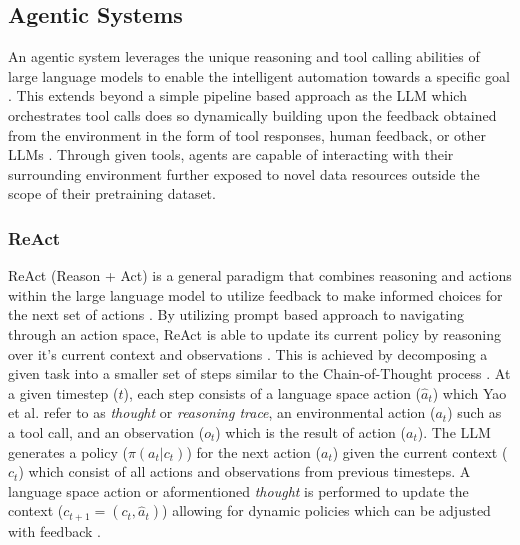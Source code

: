 \subsection{Agentic Systems}

An agentic system leverages the unique reasoning and tool calling abilities of
large language models to enable the intelligent automation towards a specific
goal \cite{pak_agentic_2026, jadhav_large_2026, chandrasekhar_automating_2025,
pak_rocketsmith_2026}. This extends beyond a simple pipeline based approach as
the LLM which orchestrates tool calls does so dynamically building upon the
feedback obtained from the environment in the form of tool responses, human
feedback, or other LLMs \cite{yao_react_2022}. Through given tools, agents are
capable of interacting with their surrounding environment further exposed to
novel data resources outside the scope of their pretraining dataset.

\subsubsection{ReAct}
ReAct (Reason + Act) is a general paradigm that combines reasoning and actions
within the large language model to utilize feedback to make informed choices for
the next set of actions \cite{yao_react_2022}. By utilizing prompt based
approach to navigating through an action space, ReAct is able to update its
current policy by reasoning over it's current context and observations
\cite{yao_react_2022}. This is achieved by decomposing a given task into a
smaller set of steps similar to the Chain-of-Thought process
\cite{yao_react_2022, wei_chain--thought_2023}. At a given timestep ($t$), each
step consists of a language space action ($\hat{a}_t$) which Yao et al.
\cite{yao_react_2022} refer to as \textit{thought} or \textit{reasoning trace},
an environmental action ($a_t$) such as a tool call, and an observation ($o_t$)
which is the result of action ($a_t$). The LLM generates a policy
($\pi(a_t|c_t)$) for the next action ($a_t$) given the current context ($c_t$)
which consist of all actions and observations from previous timesteps. A
language space action or aformentioned \textit{thought} is performed to update
the context ($c_{t+1} = (c_t, \hat{a}_t)$) allowing for dynamic policies which
can be adjusted with feedback \cite{yao_react_2022}.

